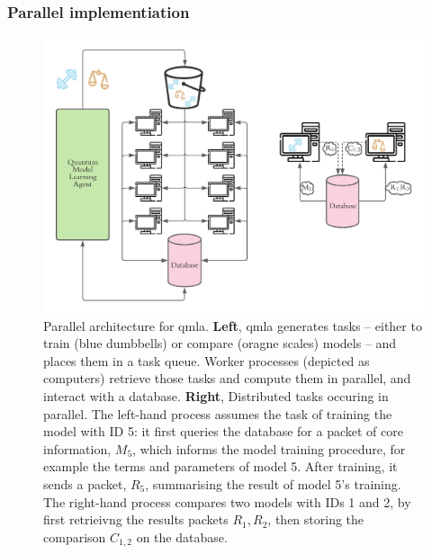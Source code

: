 \subsubsection{Parallel implementiation}\label{sec:parallel}
\begin{figure}
    \includegraphics{algorithms/parallel_architecture.pdf}
    \caption[Parallel architecture for \gls{qmla}]{
        Parallel architecture for \gls{qmla}.
        \textbf{Left}, \gls{qmla} generates tasks 
            -- either to train (blue dumbbells) or compare (oragne scales) models -- 
            and places them in a task queue. 
        Worker processes (depicted as computers) retrieve those tasks and compute them in parallel, 
            and interact with a database. 
        \textbf{Right}, Distributed tasks occuring in parallel. 
        The left-hand process assumes the task of training the model with ID 5:
            it first queries the database for a packet of core information, $M_5$, 
            which informs the model training procedure, for example the terms and parameters 
            of model 5. 
        After training, it sends a packet, $R_5$, summarising the result of model 5's training. 
        The right-hand process compares two models with IDs 1 and 2, by first retrieivng the results packets
            $R_1, R_2$, then storing the comparison $C_{1,2}$ on the database. 
    }
    \label{fig:parallel}
\end{figure}

